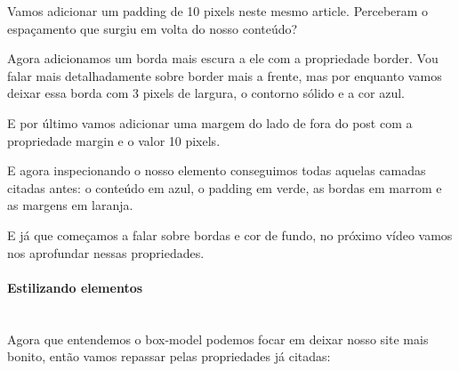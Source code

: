 \documentclass[12pt,a4paper]{article}
\begin{document}
	Vamos adicionar um padding de 10 pixels neste mesmo article. Perceberam o espaçamento que surgiu em volta do nosso conteúdo?
	
	Agora adicionamos um borda mais escura a ele com a propriedade border. Vou falar mais detalhadamente sobre border mais a frente, mas por enquanto vamos deixar essa borda com 3 pixels de largura, o contorno sólido e a cor azul.
	
	E por último vamos adicionar uma margem do lado de fora do post com a propriedade margin e o valor 10 pixels.
	
	E agora inspecionando o nosso elemento conseguimos todas aquelas camadas citadas antes: o conteúdo em azul, o padding em verde, as bordas em marrom e as margens em laranja.
	
	E já que começamos a falar sobre bordas e cor de fundo, no próximo vídeo vamos nos aprofundar nessas propriedades.
	
	\paragraph{Estilizando elementos} \mbox{} \\
	
	Agora que entendemos o box-model podemos focar em deixar nosso site mais bonito, então vamos repassar pelas propriedades já citadas:
	
\end{document}
